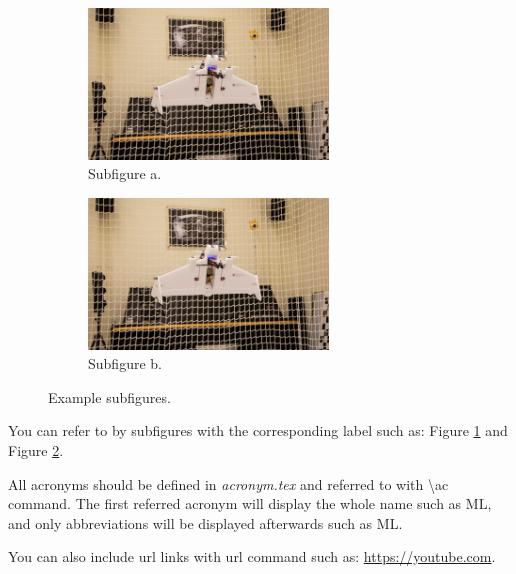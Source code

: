 \begin{figure}[!htbp]
    \begin{subfigure}{\textwidth}
        \centering
        \includegraphics[width=0.7\textwidth]{images/figures/example_figure.jpg}
        \caption{Subfigure a.}
        \label{fig::subfigure_a}
    \end{subfigure}
    \begin{subfigure}{\textwidth}
        \centering
	\includegraphics[width=0.7\textwidth]{images/figures/example_figure.jpg}
        \caption{Subfigure b.}
        \label{fig::subfigure_b}
    \end{subfigure}
    \caption{Example subfigures.}
    \label{fig::subfigures}
\end{figure}

You can refer to by subfigures with the corresponding label such as: Figure \ref{fig::subfigure_a} and Figure \ref{fig::subfigure_b}.

All acronyms should be defined in \textit{acronym.tex} and referred to with \textbackslash ac command. The first referred acronym will display the whole name such as \ac{ML}, and only abbreviations will be displayed afterwards such as \ac{ML}.

You can also include url links with url command such as: \url{https://youtube.com}.
